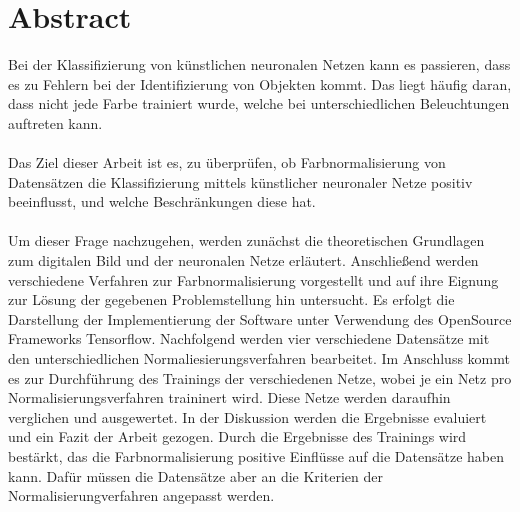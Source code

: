 \chapter*{Abstract}
Bei der Klassifizierung von künstlichen neuronalen Netzen kann es passieren, dass es zu Fehlern bei der Identifizierung von Objekten kommt. Das liegt häufig daran, dass nicht jede Farbe trainiert wurde, welche bei unterschiedlichen Beleuchtungen auftreten kann.\\\\
Das Ziel dieser Arbeit ist es, zu überprüfen, ob Farbnormalisierung von Datensätzen die Klassifizierung mittels künstlicher neuronaler Netze positiv beeinflusst, und welche Beschränkungen diese hat.\\\\
Um dieser Frage nachzugehen, werden zunächst die theoretischen Grundlagen zum digitalen Bild und der neuronalen Netze erläutert. Anschließend  werden  verschiedene Verfahren zur Farbnormalisierung vorgestellt und auf ihre Eignung zur Lösung der gegebenen Problemstellung hin untersucht. Es erfolgt die Darstellung der Implementierung der Software unter Verwendung des OpenSource Frameworks Tensorflow. Nachfolgend werden vier verschiedene Datensätze mit den unterschiedlichen Normaliesierungsverfahren bearbeitet. Im Anschluss kommt es zur Durchführung des Trainings der verschiedenen Netze, wobei je ein Netz pro Normalisierungsverfahren traininert wird. Diese Netze werden daraufhin verglichen und ausgewertet. In der Diskussion werden die Ergebnisse evaluiert und ein Fazit der Arbeit gezogen. Durch die Ergebnisse des Trainings wird bestärkt, das die Farbnormalisierung positive Einflüsse auf die Datensätze haben kann. Dafür müssen die Datensätze aber an die Kriterien der Normalisierungverfahren angepasst werden. 
